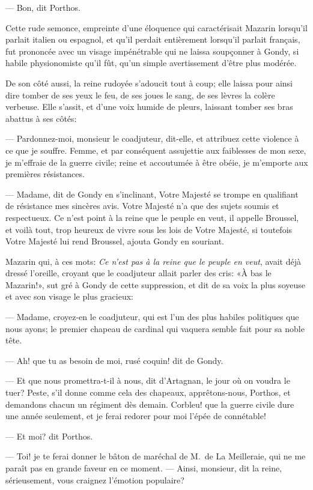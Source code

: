 — Bon, dit Porthos.

Cette rude semonce, empreinte d'une éloquence qui caractérisait Mazarin lorsqu'il parlait italien ou espagnol, et qu'il perdait entièrement lorsqu'il parlait français, fut prononcée avec un visage impénétrable qui ne laissa soupçonner à Gondy, si habile physionomiste qu'il fût, qu'un simple avertissement d'être plus modérée.

De son côté aussi, la reine rudoyée s'adoucit tout à coup; elle laissa pour ainsi dire tomber de ses yeux le feu, de ses joues le sang, de ses lèvres la colère verbeuse. Elle s'assit, et d'une voix humide de pleurs, laissant tomber ses bras abattus à ses côtés:

— Pardonnez-moi, monsieur le coadjuteur, dit-elle, et attribuez cette violence à ce que je souffre. Femme, et par conséquent assujettie aux faiblesses de mon sexe, je m'effraie de la guerre civile; reine et accoutumée à être obéie, je m'emporte aux premières résistances.

— Madame, dit de Gondy en s'inclinant, Votre Majesté se trompe en qualifiant de résistance mes sincères avis. Votre Majesté n'a que des sujets soumis et respectueux. Ce n'est point à la reine que le peuple en veut, il appelle Broussel, et voilà tout, trop heureux de vivre sous les lois de Votre Majesté, si toutefois Votre Majesté lui rend Broussel, ajouta Gondy en souriant.

Mazarin qui, à ces mots:\textit{ Ce n'est pas à la reine que le peuple en veut}, avait déjà dressé l'oreille, croyant que le coadjuteur allait parler des cris: «À bas le Mazarin!», sut gré à Gondy de cette suppression, et dit de sa voix la plus soyeuse et avec son visage le plus gracieux:

— Madame, croyez-en le coadjuteur, qui est l'un des plus habiles politiques que nous ayons; le premier chapeau de cardinal qui vaquera semble fait pour sa noble tête.

— Ah! que tu as besoin de moi, rusé coquin! dit de Gondy.

— Et que nous promettra-t-il à nous, dit d'Artagnan, le jour où on voudra le tuer? Peste, s'il donne comme cela des chapeaux, apprêtons-nous, Porthos, et demandons chacun un régiment dès demain. Corbleu! que la guerre civile dure une année seulement, et je ferai redorer pour moi l'épée de connétable!

— Et moi? dit Porthos.

— Toi! je te ferai donner le bâton de maréchal de M.~de La Meilleraie, qui ne me paraît pas en grande faveur en ce moment.
— Ainsi, monsieur, dit la reine, sérieusement, vous craignez l'émotion populaire?

